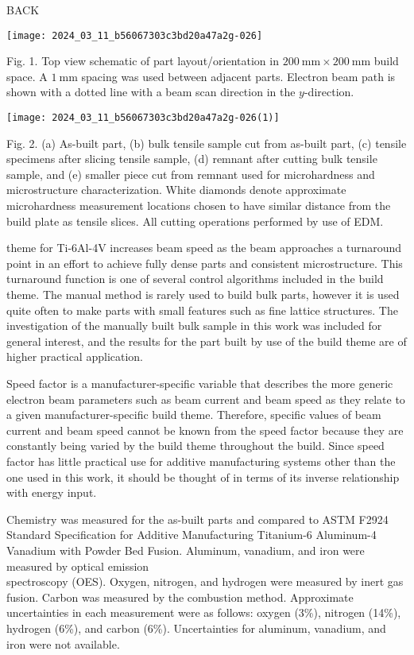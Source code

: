 \documentclass[10pt]{article}
\begin{document}
BACK

\begin{center}
\texttt{[image: 2024\_03\_11\_b56067303c3bd20a47a2g-026]}
\end{center}

Fig. 1. Top view schematic of part layout/orientation in $200 \mathrm{~mm} \times 200 \mathrm{~mm}$ build space. A $1 \mathrm{~mm}$ spacing was used between adjacent parts. Electron beam path is shown with a dotted line with a beam scan direction in the $y$-direction.

\begin{center}
\texttt{[image: 2024\_03\_11\_b56067303c3bd20a47a2g-026(1)]}
\end{center}

Fig. 2. (a) As-built part, (b) bulk tensile sample cut from as-built part, (c) tensile specimens after slicing tensile sample, (d) remnant after cutting bulk tensile sample, and (e) smaller piece cut from remnant used for microhardness and microstructure characterization. White diamonds denote approximate microhardness measurement locations chosen to have similar distance from the build plate as tensile slices. All cutting operations performed by use of EDM.

theme for Ti-6Al-4V increases beam speed as the beam approaches a turnaround point in an effort to achieve fully dense parts and consistent microstructure. This turnaround function is one of several control algorithms included in the build theme. The manual method is rarely used to build bulk parts, however it is used quite often to make parts with small features such as fine lattice structures. The investigation of the manually built bulk sample in this work was included for general interest, and the results for the part built by use of the build theme are of higher practical application.

Speed factor is a manufacturer-specific variable that describes the more generic electron beam parameters such as beam current and beam speed as they relate to a given manufacturer-specific build theme. Therefore, specific values of beam current and beam speed cannot be known from the speed factor because they are constantly being varied by the build theme throughout the build. Since speed factor has little practical use for additive manufacturing systems other than the one used in this work, it should be thought of in terms of its inverse relationship with energy input.

Chemistry was measured for the as-built parts and compared to ASTM F2924 Standard Specification for Additive Manufacturing Titanium-6 Aluminum-4 Vanadium with Powder Bed Fusion. Aluminum, vanadium, and iron were measured by optical emission\\
spectroscopy (OES). Oxygen, nitrogen, and hydrogen were measured by inert gas fusion. Carbon was measured by the combustion method. Approximate uncertainties in each measurement were as follows: oxygen (3\%), nitrogen (14\%), hydrogen (6\%), and carbon (6\%). Uncertainties for aluminum, vanadium, and iron were not available.
\end{document}
